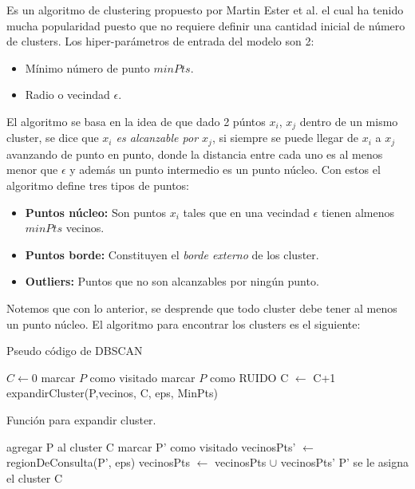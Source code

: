 Es un algoritmo de clustering propuesto por Martin Ester et al. el cual ha tenido mucha popularidad puesto que no requiere definir una cantidad inicial de número de clusters. Los hiper-parámetros de entrada del modelo son 2:

\begin{itemize}
    \item Mínimo número de punto $minPts$.
    \item Radio o vecindad $\epsilon$.
\end{itemize}

El algoritmo se basa en la idea de que dado 2 púntos $x_i$, $x_j$ dentro de un mismo cluster, se dice que \emph{$x_i$ es alcanzable por $x_j$}, si siempre se puede llegar de $x_i$ a $x_j$ avanzando de punto en punto, donde la distancia entre cada uno es al menos menor que $\epsilon$ y además un punto intermedio es un punto núcleo. Con estos el algoritmo define tres tipos de puntos:

\begin{itemize}
    \item \textbf{Puntos núcleo:} Son puntos $x_i$ tales que en una vecindad $\epsilon$ tienen almenos $minPts$ vecinos.
    \item \textbf{Puntos borde:} Constituyen el \textit{borde externo} de los cluster.
    \item \textbf{Outliers:} Puntos que no son alcanzables por ningún punto.
\end{itemize}

Notemos que con lo anterior, se desprende que todo cluster debe tener al menos un punto núcleo.
El algoritmo para encontrar los clusters es el siguiente:


\begin{algorithm}[H]
  \caption{Pseudo código de DBSCAN
    \label{DBSCAN}}
  \begin{algorithmic}[1]
      \State $C \gets 0$\;
      \State marcar $P$ como visitado
        \State marcar $P$ como RUIDO
        \Else
        \State C $\gets$ C+1
        \State expandirCluster(P,vecinos, C, eps, MinPts)
        \EndIf
      \EndFor
    \EndFunction
  \end{algorithmic}
\end{algorithm}


\begin{algorithm}[H]
  \caption{Función para expandir cluster.
    \label{alg:expandirCluster}}
  \begin{algorithmic}[1]
  \State agregar P al cluster C
         \State marcar P' como visitado\;
         \State vecinosPts' $\gets$ regionDeConsulta(P', eps)\;
            \State vecinosPts $\gets$ vecinosPts $\cup$ vecinosPts'
        \EndIf
    \EndIf
         \State P' se le asigna el cluster C
    \EndIf
    \EndFor
    \EndFunction
  \end{algorithmic}
\end{algorithm}


